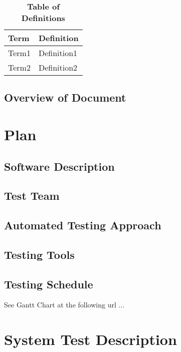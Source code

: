 \documentclass[12pt, titlepage]{article}
\begin{document}
			\begin{table}[!htbp]
				\caption{\textbf{Table of Definitions}} \label{Table}

				\begin{tabularx}{\textwidth}{p{3cm}X}
				\toprule
				\textbf{Term} & \textbf{Definition}\\
				\midrule
				Term1 & Definition1\\
				Term2 & Definition2\\
				\bottomrule
			\end{tabularx}

		\end{table}	

	\subsection{Overview of Document}

\section{Plan}
		
	\subsection{Software Description}

	\subsection{Test Team}

	\subsection{Automated Testing Approach}

	\subsection{Testing Tools}

	\subsection{Testing Schedule}
		
	See Gantt Chart at the following url ...

\section{System Test Description}
	
\end{document}
